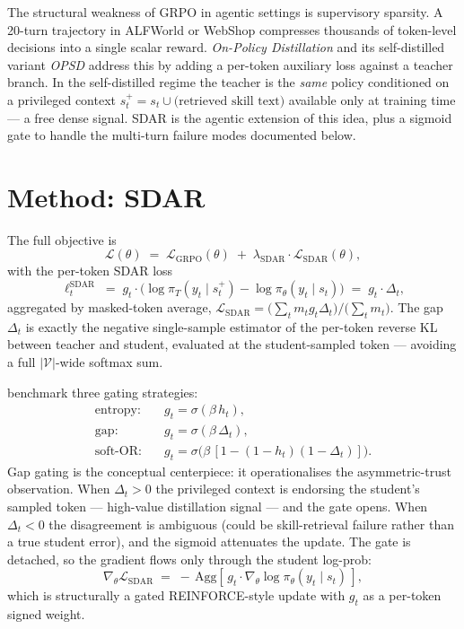 \documentclass[11pt]{article}
\begin{document}
The structural weakness of GRPO in agentic settings is supervisory
sparsity. A 20-turn trajectory in ALFWorld \citep{shridhar2020alfworld}
or WebShop \citep{yao2022webshop} compresses thousands of token-level
decisions into a single scalar reward. \emph{On-Policy Distillation}
\citep{ye2026opd, yang2026opd} and its self-distilled variant
\emph{OPSD} \citep{zhao2026opsd} address this by adding a per-token
auxiliary loss against a teacher branch. In the self-distilled regime
the teacher is the \emph{same} policy conditioned on a privileged context
$s_t^+ = s_t \cup \text{(retrieved skill text)}$ available only at training
time --- a free dense signal. SDAR \citep{lu2026sdar} is the agentic
extension of this idea, plus a sigmoid gate to handle the multi-turn
failure modes documented below.

\section*{Method: SDAR}

The full objective is
\begin{equation}
\mathcal{L}(\theta) \;=\; \mathcal{L}_{\mathrm{GRPO}}(\theta)
       \;+\; \lambda_{\mathrm{SDAR}}\cdot \mathcal{L}_{\mathrm{SDAR}}(\theta),
\label{eq:sdar-objective}
\end{equation}
with the per-token SDAR loss
\begin{equation}
\ell_t^{\mathrm{SDAR}} \;=\; g_t \cdot \big(\log\pi_T(y_t\mid s_t^+) - \log\pi_\theta(y_t\mid s_t)\big)
       \;=\; g_t\cdot \Delta_t,
\label{eq:sdar-token}
\end{equation}
aggregated by masked-token average,
$\mathcal{L}_{\mathrm{SDAR}} = \big(\sum_t m_t g_t \Delta_t\big) / \big(\sum_t m_t\big)$.
The gap $\Delta_t$ is exactly the negative single-sample estimator of the
per-token reverse KL between teacher and student, evaluated at the
student-sampled token --- avoiding a full $|\mathcal{V}|$-wide softmax sum.

\citet{lu2026sdar} benchmark three gating strategies:
\begin{align}
\text{entropy:}  \quad & g_t = \sigma(\beta\, h_t), \\
\text{gap:}      \quad & g_t = \sigma(\beta\, \Delta_t), \\
\text{soft-OR:}  \quad & g_t = \sigma\!\big(\beta\,[1 - (1-h_t)(1-\Delta_t)]\big).
\end{align}
Gap gating is the conceptual centerpiece: it operationalises the
asymmetric-trust observation. When $\Delta_t > 0$ the privileged context
is endorsing the student's sampled token --- high-value distillation
signal --- and the gate opens. When $\Delta_t < 0$ the disagreement is
ambiguous (could be skill-retrieval failure rather than a true student
error), and the sigmoid attenuates the update. The gate is detached, so
the gradient flows only through the student log-prob:
\begin{equation}
\nabla_\theta \mathcal{L}_{\mathrm{SDAR}}
  \;=\; -\,\mathrm{Agg}\!\left[\,g_t\cdot \nabla_\theta \log\pi_\theta(y_t\mid s_t)\,\right],
\end{equation}
which is structurally a gated REINFORCE-style update with $g_t$ as a
per-token signed weight.
\end{document}
